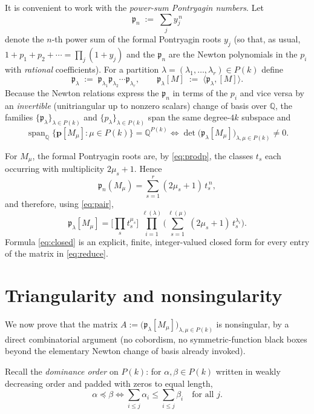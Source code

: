 \documentclass[12pt]{article}
\theoremstyle{definition}
\begin{document}
It is convenient to work with the \emph{power-sum Pontryagin numbers}.  Let
\[
\mathfrak{p}_n\;:=\;\sum_{j} y_j^{\,n}
\]
denote the $n$-th power sum of the formal Pontryagin roots $y_j$ (so that, as usual,
$1+p_1+p_2+\cdots=\prod_j(1+y_j)$ and the $\mathfrak{p}_n$ are the Newton polynomials in
the $p_i$ with \emph{rational} coefficients).  For a partition
$\lambda=(\lambda_1,\dots,\lambda_r)\in P(k)$ define
\[
\mathfrak{p}_\lambda\;:=\;\mathfrak{p}_{\lambda_1}\mathfrak{p}_{\lambda_2}\cdots
\mathfrak{p}_{\lambda_r},
\qquad
\mathfrak{p}_\lambda[M]\;:=\;\langle\mathfrak{p}_\lambda,[M]\rangle.
\]
Because the Newton relations express the $\mathfrak{p}_n$ in terms of the $p_i$ and vice
versa by an \emph{invertible} (unitriangular up to nonzero scalars) change of basis over
$\mathbb{Q}$, the families $\{\mathfrak{p}_\lambda\}_{\lambda\in P(k)}$ and
$\{p_\lambda\}_{\lambda\in P(k)}$ span the same degree-$4k$ subspace and
\[
\operatorname{span}_\mathbb{Q}\{\mathbf{p}[M_\mu]:\mu\in P(k)\}
=\mathbb{Q}^{P(k)}
\iff
\det\big(\mathfrak{p}_\lambda[M_\mu]\big)_{\lambda,\mu\in P(k)}\neq 0.
\tag{6}\label{eq:reduce}
\]

For $M_\mu$, the formal Pontryagin roots are, by \eqref{eq:prodp}, the classes $t_s$ each
occurring with multiplicity $2\mu_s+1$.  Hence
\[
\mathfrak{p}_n(M_\mu)=\sum_{s=1}^{r}(2\mu_s+1)\,t_s^{\,n},
\]
and therefore, using \eqref{eq:pair},
\[
\mathfrak{p}_\lambda[M_\mu]
=\Big[\textstyle\prod_{s} t_s^{\mu_s}\Big]\
\prod_{i=1}^{\ell(\lambda)}\Big(\sum_{s=1}^{\ell(\mu)}(2\mu_s+1)\,t_s^{\lambda_i}\Big).
\tag{7}\label{eq:closed}
\]
Formula \eqref{eq:closed} is an explicit, finite, integer-valued closed form for every
entry of the matrix in \eqref{eq:reduce}.

\bigskip

\section{Triangularity and nonsingularity}

We now prove that the matrix
$A:=\big(\mathfrak{p}_\lambda[M_\mu]\big)_{\lambda,\mu\in P(k)}$ is nonsingular, by a
direct combinatorial argument (no cobordism, no symmetric-function black boxes beyond the
elementary Newton change of basis already invoked).

Recall the \emph{dominance order} on $P(k)$: for $\alpha,\beta\in P(k)$ written in
weakly decreasing order and padded with zeros to equal length,
\[
\alpha\preceq\beta\iff
\sum_{i\le j}\alpha_i\le\sum_{i\le j}\beta_i\quad\text{for all }j.
\]
\end{document}
